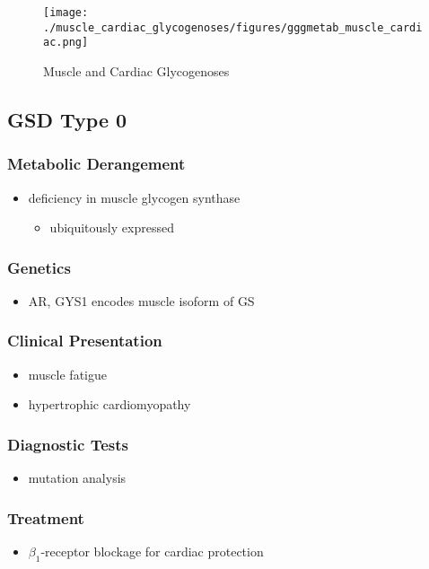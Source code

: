 \documentclass{scrartcl}
\begin{document}
\begin{figure}[htbp]
\centering
\texttt{[image: ./muscle\_cardiac\_glycogenoses/figures/gggmetab\_muscle\_cardiac.png]}
\caption[Muscle and Cardiac Glycogenoses]{\label{fig:org080c749}
Muscle and Cardiac Glycogenoses}
\end{figure}

\subsection{GSD Type 0}
\label{sec:org66a4905}
\subsubsection{Metabolic Derangement}
\label{sec:org0e2f9a9}
\begin{itemize}
\item deficiency in muscle glycogen synthase
\begin{itemize}
\item ubiquitously expressed
\end{itemize}
\end{itemize}
\subsubsection{Genetics}
\label{sec:orgad34f08}
\begin{itemize}
\item AR, GYS1 encodes muscle isoform of GS
\end{itemize}
\subsubsection{Clinical Presentation}
\label{sec:orgd058d22}
\begin{itemize}
\item muscle fatigue
\item hypertrophic cardiomyopathy
\end{itemize}
\subsubsection{Diagnostic Tests}
\label{sec:org4e60117}
\begin{itemize}
\item mutation analysis
\end{itemize}
\subsubsection{Treatment}
\label{sec:org53b1a37}
\begin{itemize}
\item \(\beta_{\text{1}}\)-receptor blockage for cardiac protection
\end{itemize}
\end{document}
